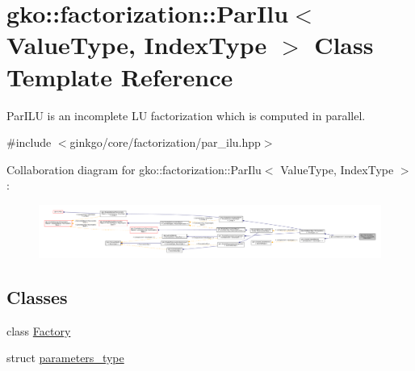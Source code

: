 \hypertarget{classgko_1_1factorization_1_1ParIlu}{}\section{gko\+:\+:factorization\+:\+:Par\+Ilu$<$ Value\+Type, Index\+Type $>$ Class Template Reference}
\label{classgko_1_1factorization_1_1ParIlu}


Par\+I\+LU is an incomplete LU factorization which is computed in parallel.  




{\ttfamily \#include $<$ginkgo/core/factorization/par\+\_\+ilu.\+hpp$>$}



Collaboration diagram for gko\+:\+:factorization\+:\+:Par\+Ilu$<$ Value\+Type, Index\+Type $>$\+:
\nopagebreak
\begin{figure}[H]
\begin{center}
\leavevmode
\includegraphics[width=350pt]{classgko_1_1factorization_1_1ParIlu__coll__graph}
\end{center}
\end{figure}
\subsection*{Classes}
\begin{DoxyCompactItemize}
\item 
class \hyperlink{classgko_1_1factorization_1_1ParIlu_1_1Factory}{Factory}
\item 
struct \hyperlink{structgko_1_1factorization_1_1ParIlu_1_1parameters__type}{parameters\+\_\+type}
\end{DoxyCompactItemize}
